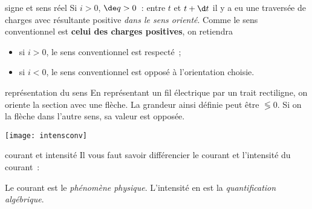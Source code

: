\documentclass[../main/main.tex]{subfiles}
\begin{document}
\begin{tcbraster}[raster columns=2, raster equal height=rows]
    \begin{impl}[label=impl:intensconv]{signe et sens réel}
        Si $i > 0$, $\de q > 0$~: entre $t$ et $t+\d t$ il y a eu une traversée de
        charges avec résultante positive \textit{dans le sens orienté}. Comme le
        sens conventionnel est \textbf{celui des charges positives}, on retiendra
        \begin{itemize}
            \item si $i > 0$, le sens conventionnel est respecté~;
            \item si $i < 0$, le sens conventionnel est opposé à l'orientation
                choisie.
        \end{itemize}
    \end{impl}
    \begin{nota}[label=nota:intensconv]{représentation du sens}
        En représentant un fil électrique par un trait rectiligne, on oriente la
        section avec une flèche. La grandeur ainsi définie peut être $\lessgtr 0$.
        Si on la flèche dans l'autre sens, sa valeur est opposée.
        \tcblower
        \begin{center}
            \texttt{[image: intensconv]}
        \end{center}
    \end{nota}
\end{tcbraster}
\begin{impo}[label=impo:courantintensité]{courant et intensité}
    Il vous faut savoir différencier le courant et l'intensité du courant~:
    \begin{imposide}
        Le courant est le \textit{phénomène physique}.
        \tcblower
        L'intensité en est la \textit{quantification algébrique}.
    \end{imposide}
\end{impo}
\end{document}
